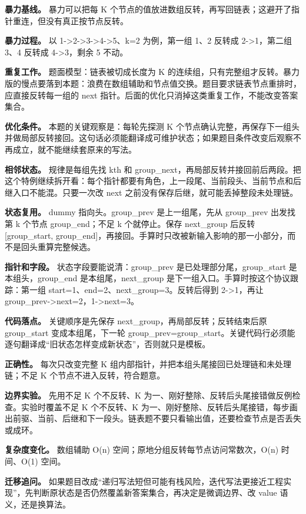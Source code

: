\textbf{暴力基线。} 暴力可以把每 K 个节点的值放进数组反转，再写回链表；这避开了指针重连，但没有真正按节点反转。

\textbf{暴力过程。} 以 1->2->3->4->5、k=2 为例，第一组 1、2 反转成 2->1，第二组 3、4 反转成 4->3，剩余 5 不动。

\textbf{重复工作。} 题面模型：链表被切成长度为 K 的连续组，只有完整组才反转。暴力版的慢点要落到本题：浪费在数组辅助和节点值交换。题目要求链表节点重排时，应直接反转每一组的 next 指针。后面的优化只消掉这类重复工作，不能改变答案集合。

\textbf{优化条件。} 本题的关键观察是：每轮先探测 K 个节点确认完整，再保存下一组头并做局部反转接回。这句话必须能翻译成可维护状态；如果题目条件改变后观察不再成立，就不能继续套原来的写法。

\textbf{相邻状态。} 规律是每组先找 kth 和 group\_next，再局部反转并接回前后两段。把这个特例继续拆开看：每个指针都要有角色，上一段尾、当前段头、当前节点和后继入口不能混。只要一次改 next 之前没有保存后继，就可能丢掉整段未处理链。

\textbf{状态复用。} dummy 指向头。group\_prev 是上一组尾，先从 group\_prev 出发找第 k 个节点 group\_end；不足 k 个就停止。保存 next\_group 后反转 [group\_start, group\_end]，再接回。手算时只改被新输入影响的那一小部分，而不是回头重算完整候选。

\textbf{指针和字段。} 状态字段要能说清：group\_prev 是已处理部分尾，group\_start 是本组头，group\_end 是本组尾，next\_group 是下一组入口。手算时按这个协议跟踪：第一组 start=1、end=2、next\_group=3。反转后得到 2->1，再让 group\_prev->next=2，1->next=3。

\textbf{代码落点。} 关键顺序是先保存 next\_group，再局部反转；反转结束后原 group\_start 变成本组尾，下一轮 group\_prev=group\_start。关键代码行必须能逐句翻译成“旧状态怎样变成新状态”，否则就只是模板。

\textbf{正确性。} 每次只改变完整 K 组内部指针，并把本组头尾接回已处理链和未处理链；不足 K 个节点不进入反转，符合题意。

\textbf{边界实验。} 先用不足 K 个不反转、K 为一、刚好整除、反转后头尾接错做反例检查。实验时覆盖不足 K 个不反转、K 为一、刚好整除、反转后头尾接错，每步画出前驱、当前、后继和下一段头。链表题不要只看输出值，还要检查节点是否丢失或成环。

\textbf{复杂度变化。} 数组辅助 O(n) 空间；原地分组反转每节点访问常数次，O(n) 时间、O(1) 空间。

\textbf{迁移追问。} 如果题目改成“递归写法短但可能有栈风险，迭代写法更接近工程实现”，先判断原状态是否仍然覆盖新答案集合，再决定是微调边界、改 value 语义，还是换算法。


